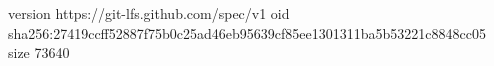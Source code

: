 version https://git-lfs.github.com/spec/v1
oid sha256:27419ccff52887f75b0c25ad46eb95639cf85ee1301311ba5b53221c8848cc05
size 73640
